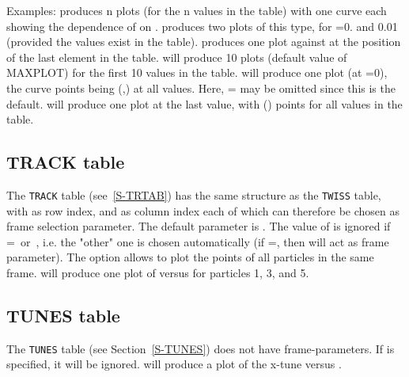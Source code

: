 Examples:
produces n plots (for the n  values in the table)
with one curve each showing the dependence of  on .
produces two plots of this type, for =0. and 0.01
(provided the  values exist in the table).
produces one plot  against  at the position
of the last element in the table.
will produce 10 plots (default value of MAXPLOT)
for the first 10  values in the table.
will produce one plot (at =0),
the curve points being (,) at all  values.
Here, = may be omitted
since this is the default.
will produce one plot at the last  value,
with () points for all  values
in the table.
 
\subsection{TRACK table}
The {\tt TRACK} table (see~\ref{S-TRTAB})
has the same structure as the {\tt TWISS} table, with
 as row index, and  as column index
each of which can therefore be chosen as frame selection parameter.
The default parameter is .
The value of  is ignored if
=~or~,
i.e. the "other" one is chosen
automatically (if =,
then  will act as frame parameter).
The option
 allows to plot the points of all particles in the
same frame.
will produce one plot of  versus  for particles
1, 3, and 5.
 
\subsection{TUNES table}
The {\tt TUNES} table
(see Section~\ref{S-TUNES})
does not have frame-parameters.
If  is specified, it will be ignored.
will produce a plot of the x-tune versus .
 
